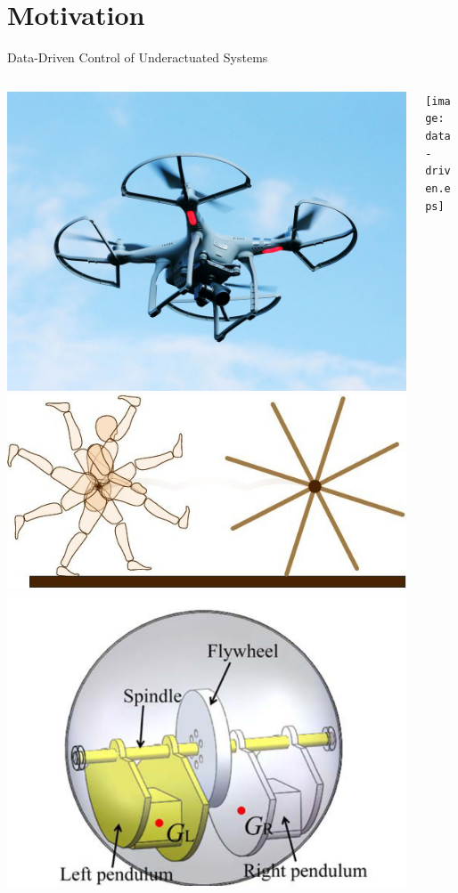 \section{Motivation}
\centering
{}

\begin{frame}{Data-Driven Control of Underactuated Systems}
    \begin{columns}
        \begin{column}[]{0.48\linewidth}
            \vspace{0.5em}
            \includegraphics[width=0.4\linewidth, left]{./figures/drone.jpg}
            \includegraphics[width=0.5\linewidth, right]{./figures/yoyoman.jpg}
            \includegraphics[width=0.5\linewidth, left]{./figures/spherical_robot.png}
        \end{column}
        \begin{column}[]{0.48\linewidth}
            \vspace{0.5em}\texttt{[image: data-driven.eps]}    
        \end{column}
    \end{columns}
    \small
\end{frame}

